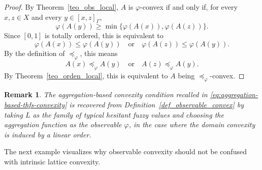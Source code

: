 \documentclass[11pt,a4paper]{article}
\newtheorem{remark}{Remark}
\begin{document}
\begin{proof}
By Theorem~\ref{teo_obs_local}, \(A\) is \(\varphi\)-convex if and only if, for every \(x,z\in X\) and every \(y\in[x,z]_{\Gamma}\),
\[
\varphi(A(y))\ge \min\{\varphi(A(x)),\varphi(A(z))\}.
\]
Since \([0,1]\) is totally ordered, this is equivalent to
\[
\varphi(A(x))\le \varphi(A(y))
\quad\text{or}\quad
\varphi(A(z))\le \varphi(A(y)).
\]
By the definition of \(\preccurlyeq_{\varphi}\), this means
\[
A(x)\preccurlyeq_{\varphi}A(y)
\quad\text{or}\quad
A(z)\preccurlyeq_{\varphi}A(y).
\]
By Theorem~\ref{teo_orden_local}, this is equivalent to \(A\) being \(\preccurlyeq_{\varphi}\)-convex.
\end{proof}

\smallskip

\begin{remark}
The aggregation-based convexity condition recalled in \eqref{eq:aggregation-based-thfs-convexity} is recovered from Definition~\ref{def_observable_convex} by taking \(L\) as the family of typical hesitant fuzzy values and choosing the aggregation function as the observable \(\varphi\), in the case where the domain convexity is induced by a linear order.
\end{remark}



\smallskip

The next example visualizes why observable convexity should not be confused with intrinsic lattice convexity.
\end{document}
